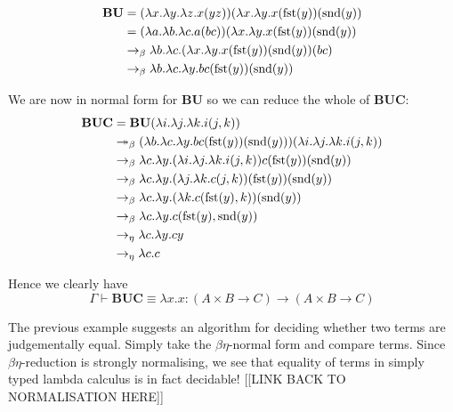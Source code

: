 \begin{example}
\begin{example}
    \begin{equation*}
        \begin{aligned}
            \mathbf{B} \mathbf{U} &= (\lambda x . \lambda y . \lambda z . x (y z)) (\lambda x .\lambda y. x (\mathrm{fst}(y))(\mathrm{snd}(y)) \\
            &= (\lambda a . \lambda b . \lambda c . a (b c)) (\lambda x .\lambda y. x (\mathrm{fst}(y))(\mathrm{snd}(y)) \\
            &\to_{\beta} \lambda b . \lambda c . (\lambda x .\lambda y. x (\mathrm{fst}(y))(\mathrm{snd}(y)) (b c)  \\
            &\to_{\beta} \lambda b . \lambda c . \lambda y. b c(\mathrm{fst}(y))(\mathrm{snd}(y))  \\
        \end{aligned}
    \end{equation*}
    
    We are now in normal form for $\mathbf{B} \mathbf{U}$ so we can reduce the whole of $\mathbf{B} \mathbf{U} \mathbf{C}$:
    \begin{equation*}
        \begin{aligned}
            \mathbf{B} \mathbf{U} \mathbf{C} &= \mathbf{B} \mathbf{U} (\lambda i . \lambda j . \lambda k . i (j , k)) \\
            &\twoheadrightarrow_{\beta} (\lambda b . \lambda c . \lambda y. b c(\mathrm{fst}(y))(\mathrm{snd}(y))) (\lambda i . \lambda j . \lambda k . i (j , k)) \\
            &\to_{\beta} \lambda c . \lambda y.  (\lambda i . \lambda j . \lambda k . i (j , k)) c(\mathrm{fst}(y))(\mathrm{snd}(y)) \\
            &\to_{\beta} \lambda c . \lambda y.  (\lambda j . \lambda k . c (j , k)) (\mathrm{fst}(y))(\mathrm{snd}(y)) \\
            &\to_{\beta} \lambda c . \lambda y.  (\lambda k . c (\mathrm{fst}(y) , k)) (\mathrm{snd}(y)) \\
            &\to_{\beta} \lambda c . \lambda y.  c (\mathrm{fst}(y) , \mathrm{snd}(y))  \\
            &\to_{\eta} \lambda c . \lambda y . c y \\
            &\to_{\eta} \lambda c . c
        \end{aligned}
    \end{equation*}
    
    Hence we clearly have
    $$
        \Gamma \vdash \mathbf{B} \mathbf{U} \mathbf{C} \equiv \lambda x . x : (A \times B \to C) \to (A \times B \to C)
    $$
\end{example}

\begin{remark}
    The previous example suggests an algorithm for deciding whether two terms are judgementally equal. Simply take the $\beta \eta$-normal form and compare terms. Since $\beta \eta$-reduction is strongly normalising, we see that equality of terms in simply typed lambda calculus is in fact decidable! [[LINK BACK TO NORMALISATION HERE]]
\end{remark}


\end{example}
